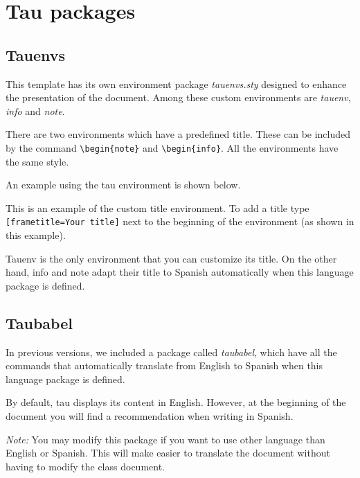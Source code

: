 \documentclass[10pt,a4paper,twocolumn,twoside]{tau-class/tau}
\begin{document}
\section{Tau packages}

    \subsection{Tauenvs}
	
        This template has its own environment package \textit{tauenvs.sty} designed to enhance the presentation of the document. Among these custom environments are \textit{tauenv}, \textit{info} and \textit{note}.
		
        There are two environments which have a predefined title. These can be included by the command \verb|\begin{note}| and \verb|\begin{info}|. All the environments have the same style.
			
        An example using the tau environment is shown below.
		
    	\begin{tauenv}[frametitle=Environment with custom title]
            This is an example of the custom title environment. To add a title type \verb|[frametitle=Your title]| next to the beginning of the environment (as shown in this example).
    	\end{tauenv}
		
        Tauenv is the only environment that you can customize its title. On the other hand, info and note adapt their title to Spanish automatically when this language package is defined.
		
    \subsection{Taubabel}

        In previous versions, we included a package called \textit{taubabel}, which have all the commands that automatically translate from English to Spanish when this language package is defined. 
        
        By default, tau displays its content in English. However, at the beginning of the document you will find a recommendation when writing in Spanish. 
		
        \textit{Note:} You may modify this package if you want to use other language than English or Spanish. This will make easier to translate the document without having to modify the class document.
		
\end{document}
